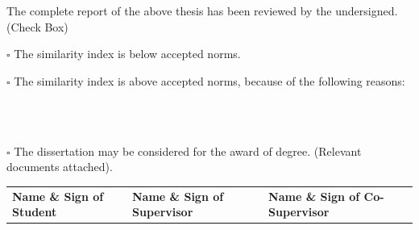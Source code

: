 \documentclass[12pt,a4paper,oneside]{report}
\begin{document}
\vspace{0.8cm}
The complete report of the above thesis has been reviewed by the undersigned. (Check Box)

$\square$ The similarity index is below accepted norms.

$\square$ The similarity index is above accepted norms, because of the following reasons:

\dotfill\\ \dotfill\\ \dotfill

$\square$ The dissertation may be considered for the award of degree. (Relevant documents attached).

\vspace{1.5cm}
\begin{tabular}{@{}p{}p{}p{}@{}}
\textbf{Name \& Sign of Student} & \textbf{Name \& Sign of Supervisor} & \textbf{Name \& Sign of Co-Supervisor}
\end{tabular}
\end{document}
